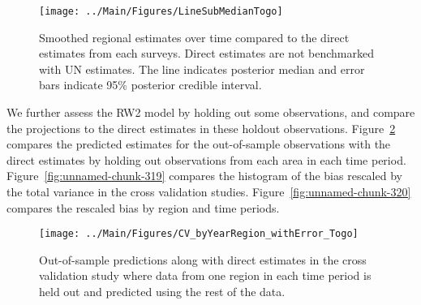 \documentclass[12pt]{article}\usepackage[]{graphicx}\usepackage[]{color}
\newenvironment{knitrout}{}{} %
\begin{document}
\begin{knitrout}
\color{fgcolor}\begin{figure}[bht]

{\centering \texttt{[image: ../Main/Figures/LineSubMedianTogo]} 

}

\caption[Smoothed regional estimates over time compared to the direct estimates from each surveys]{Smoothed regional estimates over time compared to the direct estimates from each surveys. Direct estimates are not benchmarked with UN estimates. The line indicates posterior median and error bars indicate 95\% posterior credible interval.}\label{fig:unnamed-chunk-317}
\end{figure}


\end{knitrout}
We further assess the RW2 model by holding out some observations, and compare the projections to the direct estimates in these holdout observations. Figure~\ref{fig:unnamed-chunk-318} compares the predicted estimates for the out-of-sample observations  with the direct estimates by holding out observations from each area in each time period.  Figure~\ref{fig:unnamed-chunk-319} compares the histogram of the bias rescaled by the total variance in the cross validation studies. Figure~\ref{fig:unnamed-chunk-320} compares the rescaled bias by region and time periods.



 
\begin{knitrout}
\color{fgcolor}\begin{figure}[bht]

{\centering \texttt{[image: ../Main/Figures/CV\_byYearRegion\_withError\_Togo]} 

}

\caption[Out-of-sample predictions along with direct estimates in the cross validation study where data from one region in each time period is held out and predicted using the rest of the data]{Out-of-sample predictions along with direct estimates in the cross validation study where data from one region in each time period is held out and predicted using the rest of the data.}\label{fig:unnamed-chunk-318}
\end{figure}


\end{knitrout}
\end{document}
